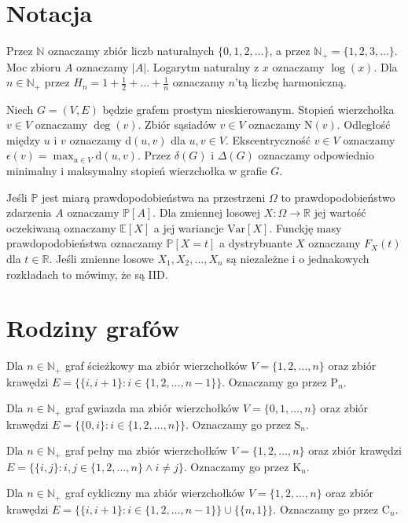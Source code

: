\section{Notacja}

Przez $\mathbb{N}$ oznaczamy zbiór liczb naturalnych $\{0,1,2,\dots\}$, a przez $\mathbb{N}_+ = \{1,2,3,\dots\}$.  Moc zbioru $A$ oznaczamy $|A|$. Logarytm naturalny z $x$ oznaczamy $\log(x)$. 
Dla $n\in\mathbb{N}_+$ przez $H_n=1+\frac{1}{2}+\dots+\frac{1}{n}$ oznaczamy $n$'tą liczbę harmoniczną.

Niech $G=(V,E)$ będzie grafem prostym nieskierowanym. Stopień wierzchołka $v \in V$ oznaczamy $\deg(v)$. Zbiór sąsiadów $v\in V$ oznaczamy $\mathrm{N}(v)$. Odległość między $u$ i $v$ oznaczamy $\mathrm{d}(u,v)$ dla $u,v\in V$. Ekscentryczność $v\in V$ oznaczamy $\epsilon(v) = \max_{u\in V} \mathrm{d}(u,v)$. Przez $\delta(G)$ i $\Delta(G)$ oznaczamy odpowiednio minimalny i maksymalny stopień wierzchołka w grafie $G$.

Jeśli $\mathbb{P}$ jest miarą prawdopodobieństwa na przestrzeni $\Omega$ to prawdopodobieństwo zdarzenia $A$ oznaczamy $\mathbb{P}[A]$. Dla zmiennej losowej $X:\Omega\to\mathbb{R}$ jej wartość oczekiwaną oznaczamy $\mathbb{E}[X]$ a jej wariancje $\mathrm{Var}[X]$. Funckję masy prawdopodobieństwa oznaczamy $\mathbb{P}[X=t]$ a dystrybuante $X$ oznaczamy $F_X(t)$ dla $t\in\mathbb{R}$. Jeśli zmienne losowe $X_1,X_2,\dots, X_n$ są niezależne i o jednakowych rozkładach to mówimy, że są IID.


\section{Rodziny grafów}

Dla $n \in \mathbb{N}_+$ graf ścieżkowy ma zbiór wierzchołków $V = \{1, 2, \dots, n\}$ oraz zbiór krawędzi $E = \{\{i, i+1\} : i \in \{1, 2, \dots, n-1\}\}$. Oznaczamy go przez $\mathrm{P}_n$.

Dla $n \in \mathbb{N}_+$ graf gwiazda ma zbiór wierzchołków $V = \{0, 1, \dots, n\}$ oraz zbiór krawędzi $E = \{\{0, i\} : i \in \{1, 2, \dots, n\}\}$. Oznaczamy go przez $\mathrm{S}_n$.

Dla $n \in \mathbb{N}_+$ graf pełny ma zbiór wierzchołków $V = \{1, 2, \dots, n\}$ oraz zbiór krawędzi $E = \{\{i, j\} : i, j \in \{1, 2, \dots, n\} \land i \ne j\}$. Oznaczamy go przez $\mathrm{K}_n$.

Dla $n \in \mathbb{N}_+$ graf cykliczny ma zbiór wierzchołków $V = \{1, 2, \dots, n\}$ oraz zbiór krawędzi 
$E = \{\{i, i+1\} : i \in \{1, 2, \dots, n-1\}\} \cup \{\{n, 1\}\}$. Oznaczamy go przez $\mathrm{C}_n$.


